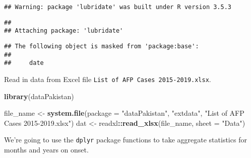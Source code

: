 \documentclass[]{article}
\newenvironment{Shaded}{\begin{snugshade}}{\end{snugshade}}
\newcommand{\CommentTok}[1]{\textcolor[rgb]{0.56,0.35,0.01}{\textit{#1}}}
\newcommand{\DataTypeTok}[1]{\textcolor[rgb]{0.13,0.29,0.53}{#1}}
\newcommand{\KeywordTok}[1]{\textcolor[rgb]{0.13,0.29,0.53}{\textbf{#1}}}
\newcommand{\NormalTok}[1]{#1}
\newcommand{\OperatorTok}[1]{\textcolor[rgb]{0.81,0.36,0.00}{\textbf{#1}}}
\newcommand{\OtherTok}[1]{\textcolor[rgb]{0.56,0.35,0.01}{#1}}
\newcommand{\StringTok}[1]{\textcolor[rgb]{0.31,0.60,0.02}{#1}}
\begin{document}
\begin{verbatim}
## Warning: package 'lubridate' was built under R version 3.5.3
\end{verbatim}

\begin{verbatim}
## 
## Attaching package: 'lubridate'
\end{verbatim}

\begin{verbatim}
## The following object is masked from 'package:base':
## 
##     date
\end{verbatim}

Read in data from Excel file
\texttt{List\ of\ AFP\ Cases\ 2015-2019.xlsx}.

\begin{Shaded}
\begin{Highlighting}[]
\KeywordTok{library}\NormalTok{(dataPakistan)}

\NormalTok{file_name <-}\StringTok{ }\KeywordTok{system.file}\NormalTok{(}\DataTypeTok{package =} \StringTok{"dataPakistan"}\NormalTok{, }\StringTok{"extdata"}\NormalTok{, }\StringTok{"List of AFP Cases 2015-2019.xlsx"}\NormalTok{)}
\NormalTok{dat <-}\StringTok{ }\NormalTok{readxl}\OperatorTok{::}\KeywordTok{read_xlsx}\NormalTok{(file_name, }\DataTypeTok{sheet =} \StringTok{"Data"}\NormalTok{)}
\end{Highlighting}
\end{Shaded}

\begin{Shaded}
\end{Shaded}

We're going to use the \texttt{dplyr} package functions to take
aggregate statistics for months and years on onset.
\end{document}
